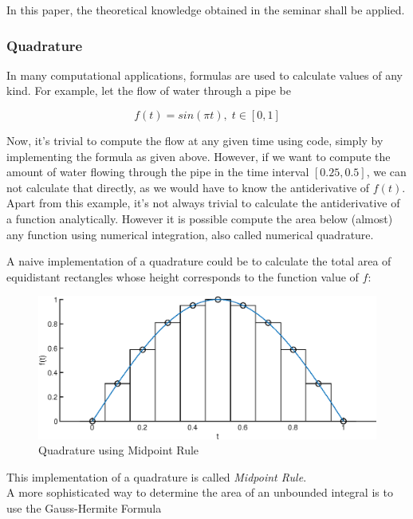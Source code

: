 \documentclass[12pt, a4paper, oneside]{article}
\begin{document}
	In this paper, the theoretical knowledge obtained in the seminar shall be applied. 
	
	\subsubsection{Quadrature}
	In many computational applications, formulas 	are used to calculate values of any kind. For example, let the flow of water through a pipe be 

	\begin{equation}
	f(t) = sin(\pi t), \; t \in [0,1]
	\end{equation}

Now, it's trivial to compute the flow at any given time using code, simply by implementing the formula as given above. However, if we want to compute the amount of water flowing through the pipe in the time interval $[0.25, 0.5]$, we can not calculate that directly, as we would have to know the antiderivative of $f(t)$. Apart from this example, it's not always trivial to calculate the antiderivative of a function analytically. However it is possible compute the area below (almost) any function using numerical integration, also called numerical quadrature. 

A naive implementation of a quadrature could be to calculate the total area of equidistant rectangles whose height corresponds to the function value of $f$: 

	\begin{figure}[ht] 
		\includegraphics[width=1\textwidth]{figures/quadratureA.eps}
		\caption{Quadrature using Midpoint Rule}
		\label{fig:quadrature-a}
	\end{figure}
This implementation of a quadrature is called \emph{Midpoint Rule}. 
\\

A more sophisticated way to determine the area of an unbounded integral is to use the Gauss-Hermite Formula
\end{document}
